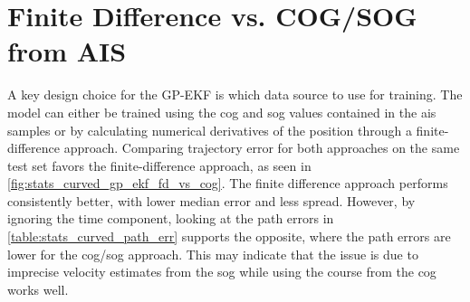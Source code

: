 \section{Finite Difference vs. COG/SOG from AIS}
A key design choice for the GP-EKF is which data source to use for training. The model can either be trained using the \acrshort{cog} and \acrshort{sog} values contained in the \acrshort{ais} samples or by calculating numerical derivatives of the position through a finite-difference approach. Comparing trajectory error for both approaches on the same test set favors the finite-difference approach, as seen in \cref{fig:stats_curved_gp_ekf_fd_vs_cog}. The finite difference approach performs consistently better, with lower median error and less spread. However, by ignoring the time component, looking at the path errors in \cref{table:stats_curved_path_err} supports the opposite, where the path errors are lower for the \acrshort{cog}/\acrshort{sog} approach. This may indicate that the issue is due to imprecise velocity estimates from the \acrshort{sog} while using the course from the \acrshort{cog} works well.

